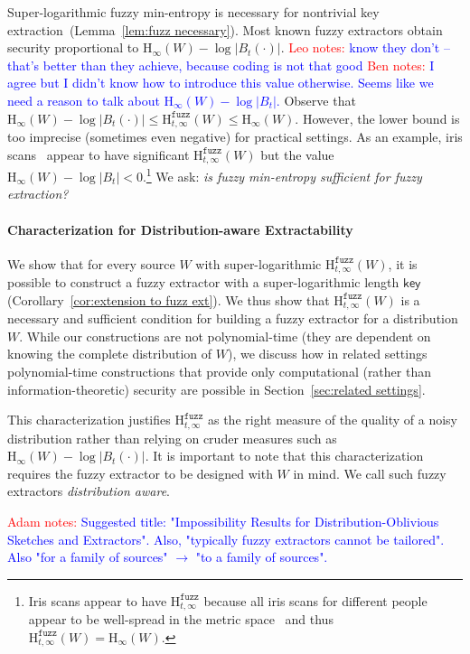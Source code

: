 \documentclass[11pt]{article}
\newcommand{\secref}[1]{\mbox{Section~\ref{#1}}}
\newcommand{\corref}[1]{\mbox{Corollary~\ref{#1}}}
\newcommand{\lemref}[1]{\mbox{Lemma~\ref{#1}}}
\newcommand{\class}[1]{{\ensuremath{\mathsf{#1}}}}
\newcommand{\key}{\ensuremath{\class{key}}\xspace}
\newcommand{\Hoo}{\mathrm{H}_\infty}
\newcommand{\Hfuzz}{\mathrm{H}^{\mathtt{fuzz}}_{t,\infty}}
\newcommand{\authnote}[2]{{\textcolor{red}{\textsf{#1 notes: }\textcolor{blue}{ #2}}\marginpar{\textcolor{red}{\textbf{!!!!!}}}}}
\newcommand{\authnote}[2]{}
\newcommand{\bnote}[1]{{\authnote{Ben}{#1}}}
\newcommand{\lnote}[1]{{\authnote{Leo}{#1}}}
\newcommand{\anote}[1]{{\authnote{Adam}{#1}}}
\begin{document}
Super-logarithmic fuzzy min-entropy  is necessary for nontrivial key extraction~(\lemref{lem:fuzz necessary}). 
Most known fuzzy extractors obtain security proportional to $\Hoo(W)-\log |B_t(\cdot)|$.  \lnote{know they don't -- that's better than they achieve, because coding is not that good} \bnote{I agree but I didn't know how to introduce this value otherwise.  Seems like we need a reason to talk about $\Hoo(W) - \log |B_t|$.}
Observe that $\Hoo(W)-\log |B_t(\cdot)| \le \Hfuzz(W) \le \Hoo(W)$.  However, the lower bound is too imprecise (sometimes even negative) for practical settings.  As an example, iris scans~\cite[Section 5]{blanton2009biometric} appear to have significant $\Hfuzz(W)$ but the value $\Hoo(W) -\log |B_t|<0$.\footnote{Iris scans appear to have $\Hfuzz$ because all iris scans for different people appear to be well-spread in the metric space~\cite{daugman2006probing} and thus $\Hfuzz(W) = \Hoo(W)$.}
We ask: \emph{is fuzzy min-entropy sufficient for fuzzy extraction?}


\paragraph{Characterization  for Distribution-aware Extractability}
We show that for every source $W$ with super-logarithmic $\Hfuzz(W)$, it is possible to construct a fuzzy extractor with a super-logarithmic length $\key$ (\corref{cor:extension to fuzz ext}). We thus show that $\Hfuzz(W)$ is a necessary and sufficient condition for building a fuzzy extractor for a distribution $W$.  While our constructions are not polynomial-time (they are dependent on knowing the complete distribution of $W$), we discuss  how in related settings polynomial-time constructions that provide only computational (rather than information-theoretic) security are possible in \secref{sec:related settings}. 

This characterization justifies $\Hfuzz$ as the right measure of the quality of a noisy distribution rather than relying on cruder measures such as $\Hoo(W)-\log |B_t(\cdot)|$.
It is important to note that this characterization requires the fuzzy extractor to be designed with $W$ in mind. We call such fuzzy extractors \emph{distribution aware}.


\anote{Suggested title: "Impossibility Results for Distribution-Oblivious Sketches and Extractors". Also, "typically fuzzy extractors cannot be tailored". Also "for a family of sources" $\to$ "to a family of sources".}
\end{document}
